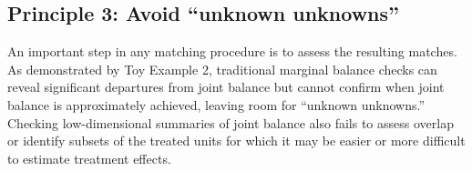 \documentclass{article}
\begin{document}

\subsection{Principle 3: Avoid ``unknown unknowns''}

An important step in any matching procedure is to assess the resulting matches.
As demonstrated by Toy Example 2, traditional marginal balance checks can reveal significant departures from joint balance but cannot confirm when joint balance is approximately achieved, leaving room for ``unknown unknowns.''
Checking low-dimensional summaries of joint balance also fails to assess overlap or identify subsets of the treated units for which it may be easier or more difficult to estimate treatment effects.
\end{document}
